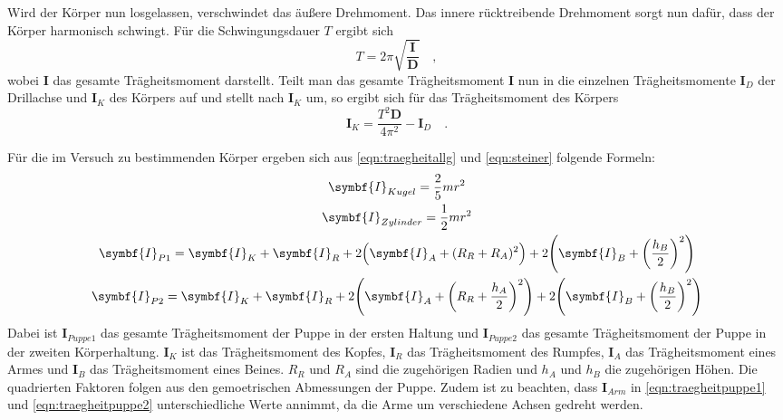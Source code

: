 Wird der Körper nun losgelassen, verschwindet das äußere Drehmoment. Das innere
rücktreibende Drehmoment sorgt nun dafür, dass der Körper harmonisch schwingt.
Für die Schwingungsdauer $T$ ergibt sich
\begin{equation}
  T=2\pi\sqrt{\frac{\symbf{I}}{\symbf{D}}}\quad,
  \label{eqn:schwingung}
\end{equation}
wobei $\symbf{I}$ das gesamte Trägheitsmoment darstellt. Teilt man das gesamte Trägheitsmoment
$\symbf{I}$ nun in die einzelnen Trägheitsmomente $\symbf{I}_D$ der Drillachse und
$\symbf{I}_K$ des Körpers auf und stellt nach $\symbf{I}_K$ um, so ergibt sich für
das Trägheitsmoment des Körpers
\begin{equation}
  \symbf{I}_K=\frac{T^2 \symbf{D}}{4\pi^2}-\symbf{I}_D\quad.
  \label{eqn:traegheitschwingung}
\end{equation}

Für die im Versuch zu bestimmenden Körper ergeben sich aus \eqref{eqn:traegheitallg}
und \eqref{eqn:steiner} folgende Formeln:
\begin{gather}
  \symbf{I}_{Kugel}=\frac{2}{5}mr^2
  \label{eqn:traegheitkugel} \\
  \symbf{I}_{Zylinder}=\frac{1}{2}mr^2
  \label{eqn:traegheitzylinder} \\
  \begin{split}
    \symbf{I}_{P1}=\symbf{I}_{K}+\symbf{I}_{R}
    +2\Bigl(\symbf{I}_{A}+(R_{R}+R_{A})^2\Bigr)
    +2\Biggl(\symbf{I}_{B}+\biggl(\frac{h_{B}}{2}\biggr)^2\Biggr)
    \label{eqn:traegheitpuppe1}
  \end{split}
  \\
  \begin{split}
    \symbf{I}_{P2}=\symbf{I}_{K}+\symbf{I}_{R}
    +2\Biggl(\symbf{I}_{A}+\biggl(R_{R}+\frac{h_{A}}{2}\biggr)^2\Biggr)
    +2\Biggl(\symbf{I}_{B}+\biggl(\frac{h_{B}}{2}\biggr)^2\Biggr)
    \label{eqn:traegheitpuppe2}
  \end{split}
\end{gather}
Dabei ist $\symbf{I}_{Puppe1}$ das gesamte Trägheitsmoment der Puppe in der ersten
Haltung und $\symbf{I}_{Puppe2}$ das gesamte Trägheitsmoment der Puppe in der
zweiten Körperhaltung. $\symbf{I}_{K}$ ist das Trägheitsmoment des Kopfes, $\symbf{I}_{R}$
das Trägheitsmoment des Rumpfes, $\symbf{I}_{A}$ das Trägheitsmoment eines Armes und
$\symbf{I}_{B}$ das Trägheitsmoment eines Beines. $R_R$ und $R_A$ sind die zugehörigen
Radien und $h_A$ und $h_B$ die zugehörigen Höhen. Die quadrierten Faktoren folgen
aus den gemoetrischen Abmessungen der Puppe. Zudem ist zu beachten, dass $\symbf{I}_{Arm}$
in \eqref{eqn:traegheitpuppe1} und \eqref{eqn:traegheitpuppe2} unterschiedliche Werte
annimmt, da die Arme um verschiedene Achsen gedreht werden.
